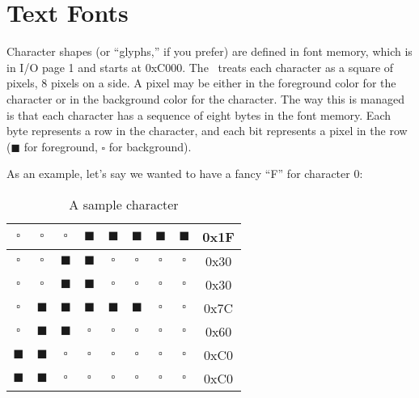 \section{Text Fonts}

Character shapes (or ``glyphs,'' if you prefer) are defined in font memory, which is in I/O page 1 and starts at 0xC000. The \jr\ treats each character as a square of pixels, 8 pixels on a side. A pixel may be either in the foreground color for the character or in the background color for the character. The way this is managed is that each character has a sequence of eight bytes in the font memory. Each byte represents a row in the character, and each bit represents a pixel in the row ($\blacksquare$ for foreground, $\square$ for background).

As an example, let's say we wanted to have a fancy ``F'' for character 0:

\begin{table}[h]
    \begin{center}
        \begin{tabular}{|c|c|c|c|c|c|c|c|c|} \hline
            $\square$ & $\square$ & $\square$ & $\blacksquare$ & $\blacksquare$ & $\blacksquare$ & $\blacksquare$ & $\blacksquare$ & 0x1F \\ \hline
            $\square$ & $\square$ & $\blacksquare$ & $\blacksquare$ & $\square$ & $\square$ & $\square$ & $\square$ & 0x30 \\ \hline
            $\square$ & $\square$ & $\blacksquare$ & $\blacksquare$ & $\square$ & $\square$ & $\square$ & $\square$ & 0x30 \\ \hline
            $\square$ & $\blacksquare$ & $\blacksquare$ & $\blacksquare$ & $\blacksquare$ & $\blacksquare$ & $\square$ & $\square$ & 0x7C \\ \hline
            $\square$ & $\blacksquare$ & $\blacksquare$ & $\square$ & $\square$ & $\square$ & $\square$ & $\square$ & 0x60 \\ \hline
            $\blacksquare$ & $\blacksquare$ & $\square$ & $\square$ & $\square$ & $\square$ & $\square$ & $\square$ & 0xC0 \\ \hline
            $\blacksquare$ & $\blacksquare$ & $\square$ & $\square$ & $\square$ & $\square$ & $\square$ & $\square$ & 0xC0 \\ \hline
        \end{tabular}
    \end{center}
    \caption{A sample character}
    \label{tab:text_font}
\end{table}

